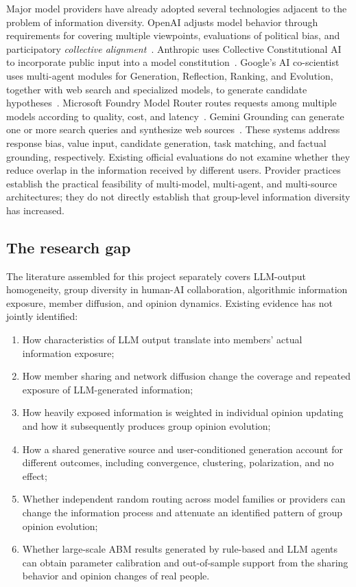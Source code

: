 \documentclass[11pt,a4paper]{article}
\newcommand{\term}[1]{\textit{#1}}
\begin{document}
Major model providers have already adopted several technologies adjacent to the problem of information diversity. OpenAI adjusts model behavior through requirements for covering multiple viewpoints, evaluations of political bias, and participatory \term{collective alignment}~\citep{openai_political_bias,openai_collective_alignment}. Anthropic uses Collective Constitutional AI to incorporate public input into a model constitution~\citep{anthropic2023}. Google's AI co-scientist uses multi-agent modules for Generation, Reflection, Ranking, and Evolution, together with web search and specialized models, to generate candidate hypotheses~\citep{gottweis2025}. Microsoft Foundry Model Router routes requests among multiple models according to quality, cost, and latency~\citep{microsoft2026}. Gemini Grounding can generate one or more search queries and synthesize web sources~\citep{google2026}. These systems address response bias, value input, candidate generation, task matching, and factual grounding, respectively. Existing official evaluations do not examine whether they reduce overlap in the information received by different users. Provider practices establish the practical feasibility of multi-model, multi-agent, and multi-source architectures; they do not directly establish that group-level information diversity has increased.

\subsection{The research gap}

The literature assembled for this project separately covers LLM-output homogeneity, group diversity in human-AI collaboration, algorithmic information exposure, member diffusion, and opinion dynamics. Existing evidence has not jointly identified:

\begin{enumerate}
\item How characteristics of LLM output translate into members' actual information exposure;
\item How member sharing and network diffusion change the coverage and repeated exposure of LLM-generated information;
\item How heavily exposed information is weighted in individual opinion updating and how it subsequently produces group opinion evolution;
\item How a shared generative source and user-conditioned generation account for different outcomes, including convergence, clustering, polarization, and no effect;
\item Whether independent random routing across model families or providers can change the information process and attenuate an identified pattern of group opinion evolution;
\item Whether large-scale ABM results generated by rule-based and LLM agents can obtain parameter calibration and out-of-sample support from the sharing behavior and opinion changes of real people.
\end{enumerate}
\end{document}
